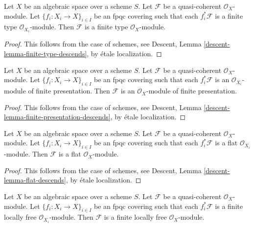 \begin{lemma}
\label{lemma-finite-type-descends}
Let $X$ be an algebraic space over a scheme $S$.
Let $\mathcal{F}$ be a quasi-coherent $\mathcal{O}_X$-module.
Let $\{f_i : X_i \to X\}_{i \in I}$ be an fpqc covering such that
each $f_i^*\mathcal{F}$ is a finite type $\mathcal{O}_{X_i}$-module.
Then $\mathcal{F}$ is a finite type $\mathcal{O}_X$-module.
\end{lemma}

\begin{proof}
This follows from the case of schemes, see
Descent, Lemma \ref{descent-lemma-finite-type-descends},
by \'etale localization.
\end{proof}

\begin{lemma}
\label{lemma-finite-presentation-descends}
Let $X$ be an algebraic space over a scheme $S$.
Let $\mathcal{F}$ be a quasi-coherent $\mathcal{O}_X$-module.
Let $\{f_i : X_i \to X\}_{i \in I}$ be an fpqc covering such that
each $f_i^*\mathcal{F}$ is an $\mathcal{O}_{X_i}$-module of finite
presentation. Then $\mathcal{F}$ is an $\mathcal{O}_X$-module
of finite presentation.
\end{lemma}

\begin{proof}
This follows from the case of schemes, see
Descent, Lemma \ref{descent-lemma-finite-presentation-descends},
by \'etale localization.
\end{proof}

\begin{lemma}
\label{lemma-flat-descends}
Let $X$ be an algebraic space over a scheme $S$.
Let $\mathcal{F}$ be a quasi-coherent $\mathcal{O}_X$-module.
Let $\{f_i : X_i \to X\}_{i \in I}$ be an fpqc covering such that
each $f_i^*\mathcal{F}$ is a flat $\mathcal{O}_{X_i}$-module.
Then $\mathcal{F}$ is a flat $\mathcal{O}_X$-module.
\end{lemma}

\begin{proof}
This follows from the case of schemes, see
Descent, Lemma \ref{descent-lemma-flat-descends},
by \'etale localization.
\end{proof}

\begin{lemma}
\label{lemma-finite-locally-free-descends}
Let $X$ be an algebraic space over a scheme $S$.
Let $\mathcal{F}$ be a quasi-coherent $\mathcal{O}_X$-module.
Let $\{f_i : X_i \to X\}_{i \in I}$ be an fpqc covering such that
each $f_i^*\mathcal{F}$ is a finite locally free $\mathcal{O}_{X_i}$-module.
Then $\mathcal{F}$ is a finite locally free $\mathcal{O}_X$-module.
\end{lemma}

